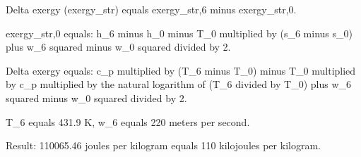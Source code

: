 Delta exergy (exergy_str) equals exergy_str,6 minus exergy_str,0.  

exergy_str,0 equals:  
h_6 minus h_0 minus T_0 multiplied by (s_6 minus s_0) plus w_6 squared minus w_0 squared divided by 2.  

Delta exergy equals:  
c_p multiplied by (T_6 minus T_0) minus T_0 multiplied by c_p multiplied by the natural logarithm of (T_6 divided by T_0) plus w_6 squared minus w_0 squared divided by 2.  

T_6 equals 431.9 K, w_6 equals 220 meters per second.  

Result: 110065.46 joules per kilogram equals 110 kilojoules per kilogram.